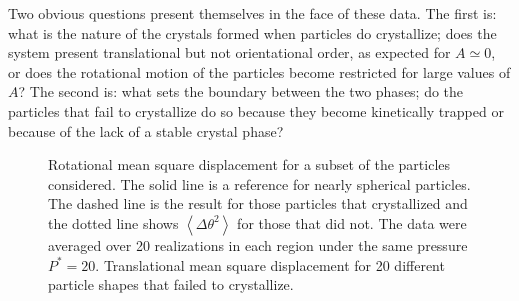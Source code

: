 Two obvious questions present themselves in the face of these data.
The first is: what is the nature of the crystals formed when particles do crystallize; 
does the system present translational but not orientational order, as expected for $A\simeq 0$, or
does the rotational motion of the particles become restricted for large values of $A$?
The second is: what sets the boundary between the two phases;
do the particles that fail to crystallize do so because they become kinetically trapped or because of the 
lack of a stable crystal phase?
\begin{figure}
	\begin{center}

	\end{center}
	\caption[Rotational and translational diffusion for aspherical particles]{ Rotational mean square displacement for a subset of the particles considered. The solid line is a 
	reference for nearly spherical particles. The dashed line is the result for  those particles that  
	 crystallized and the dotted line shows $\left<\Delta\theta^2\right>$ for those that did not.
  The data were averaged over 20 realizations in each region under the same pressure $P^*=20$.
 Translational mean square displacement for  20 different particle shapes that failed to crystallize.}\label{diff}
\end{figure}

